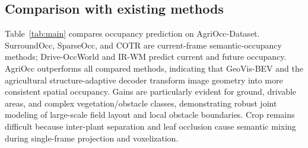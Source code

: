 \documentclass[a4paper,fleqn]{cas-sc}
\begin{document}
\subsection{Comparison with existing methods}\label{sec:comparison}
Table~\ref{tab:main} compares occupancy prediction on AgriOcc-Dataset. SurroundOcc\citep{wei2023surroundocc}, SparseOcc\citep{tang2024sparseocc}, and COTR\citep{ma2024cotr} are current-frame semantic-occupancy methods; Drive-OccWorld\citep{yangDrivingOccupancyWorld2025} and IR-WM\citep{mei2025irwm} predict current and future occupancy. AgriOcc outperforms all compared methods, indicating that GeoVis-BEV and the agricultural structure-adaptive decoder transform image geometry into more consistent spatial occupancy. Gains are particularly evident for ground, drivable areas, and complex vegetation/obstacle classes, demonstrating robust joint modeling of large-scale field layout and local obstacle boundaries. Crop remains difficult because inter-plant separation and leaf occlusion cause semantic mixing during single-frame projection and voxelization.
\end{document}
